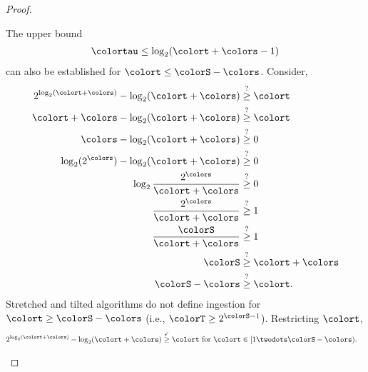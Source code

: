 \begin{proof}
\begin{proofpart}
The upper bound
\begin{align}
\colortau \leq \log_2(\colort + \colors - 1) \label{eqn:meta-epoch-bound-large}
\end{align}
can also be established for $\colort \leq \colorS - \colors$.
Consider,
\begin{align*}
2^{\log_{2}(\colort + \colors)} - \log_2(\colort + \colors)
&\stackrel{?}{\geq} \colort\\
\colort + \colors - \log_2(\colort + \colors)
&\stackrel{?}{\geq} \colort\\
\colors - \log_2(\colort + \colors)
&\stackrel{?}{\geq} 0\\
\log_2(2^{\colors}) - \log_2(\colort + \colors)
&\stackrel{?}{\geq} 0\\
\log_2\frac{2^{\colors}}{\colort + \colors}
&\stackrel{?}{\geq} 0\\
\frac{2^{\colors}}{\colort + \colors}
&\stackrel{?}{\geq} 1\\
\frac{\colorS}{\colort + \colors}
&\stackrel{?}{\geq} 1\\
\colorS
&\stackrel{?}{\geq} \colort + \colors\\
\colorS - \colors &\stackrel{?}{\geq} \colort.
\end{align*}
Stretched and tilted algorithms do not define ingestion for $\colort \geq \colorS - \colors$ (i.e., $\colorT \geq 2^{\colorS - 1}$).
Restricting $\colort$,
\begin{align*}
2^{\log_{2}(\colort + \colors)} - \log_2(\colort + \colors)
&\stackrel{\checkmark}{\geq} \colort \text{ for } \colort \in [1 \twodots \colorS - \colors).
\end{align*}
\end{proofpart}
\end{proof}
